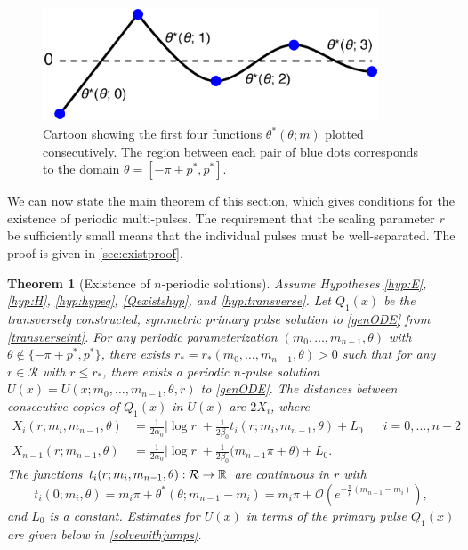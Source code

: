 \documentclass[12pt]{elsarticle}
\theoremstyle{plain}
\newtheorem{theorem}{Theorem}
\theoremstyle{definition}
\theoremstyle{remark}
\numberwithin{theorem}{section}
\numberwithin{equation}{section}
\begin{document}
\begin{figure}
\begin{center}
\includegraphics[width=10cm]{images/thetastarcartoon.eps}
\end{center}
\caption[Cartoon for $\theta^*(\theta; m)$]{Cartoon showing the first four functions $\theta^*(\theta; m)$ plotted consecutively. The region between each pair of blue dots corresponds to the domain $\theta = [-\pi + p^*, p^*]$.}
\label{fig:thetastarcartoon}
\end{figure} 

We can now state the main theorem of this section, which gives conditions for the existence of periodic multi-pulses. The requirement that the scaling parameter $r$ be sufficiently small means that the individual pulses must be well-separated. The proof is given in \cref{sec:existproof}. 

\begin{theorem}[Existence of $n$-periodic solutions]\label{th:perexist}
Assume Hypotheses \ref{hyp:E}, \ref{hyp:H}, \ref{hyp:hypeq}, \ref{Qexistshyp}, and \ref{hyp:transverse}. Let $Q_1(x)$ be the transversely constructed, symmetric primary pulse solution to \cref{genODE} from \cref{transverseint}. For any periodic parameterization $(m_0, \dots, m_{n-1}, \theta)$ with $\theta \notin \{-\pi + p^*, p^* \}$, there exists $r_* = r_*(m_0, \dots, m_{n-1}, \theta) > 0$ such that for any $r \in \mathcal{R}$ with $r \leq r_*$, there exists a periodic $n$-pulse solution $U(x) = U(x; m_0, \dots, m_{n-1}, \theta, r)$ to \cref{genODE}. The distances between consecutive copies of $Q_1(x)$ in $U(x)$ are $2X_i$, where
\begin{equation}\label{Xi}
\begin{aligned}
	X_i(r; m_i, m_{n-1},\theta) &= \frac{1}{2 \alpha_0} |\log r| + \frac{1}{2\beta_0} t_i(r; m_i,m_{n-1}, \theta) + L_0 && i = 0, \dots, n-2 \\
	X_{n-1}(r; m_{n-1}, \theta) &= \frac{1}{2 \alpha_0} |\log r| + \frac{1}{2 \beta_0}\big( m_{n-1}\pi + \theta \big) + L_0.
\end{aligned}
\end{equation}
The functions $t_i(r; m_i, m_{n-1}, \theta): \mathcal{R} \rightarrow \mathbb{R}$ are continuous in $r$ with 
\[
t_i(0; m_i, \theta) = m_i \pi + \theta^*(\theta; m_{n-1} - m_i) = m_i \pi + \mathcal{O}\left( e^{-\frac{\pi}{\rho}(m_{n-1} - m_i)} \right),
\]
and $L_0$ is a constant. Estimates for $U(x)$ in terms of the primary pulse $Q_1(x)$ are given below in \cref{solvewithjumps}.
\end{theorem}
\end{document}
